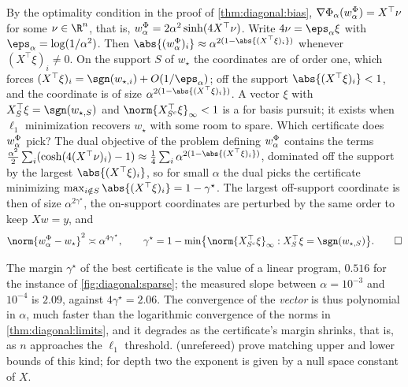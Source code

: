 \begin{refsection}
\begin{heuristic}
By the optimality condition in the proof of \cref{thm:diagonal:bias}, $\nabla\Phi_\alpha(w^\Phi_\alpha)=X^\top\nu$ for some $\nu\in\R^n$, that is, $w^\Phi_\alpha=2\alpha^2\sinh(4X^\top\nu)$. Write $4\nu=\eps_\alpha\xi$ with $\eps_\alpha=\log(1/\alpha^2)$. Then $\abs{(\diagwphi)_i}\approx\alpha^{2(1-\abs{(X^\top\xi)_i})}$ whenever $(X^\top\xi)_i\ne0$. On the support $S$ of $w_\star$ the coordinates are of order one, which forces $(X^\top\xi)_i=\sgn(w_{\star,i})+O(1/\eps_\alpha)$; off the support $\abs{(X^\top\xi)_i}<1$, and the coordinate is of size $\alpha^{2(1-\abs{(X^\top\xi)_i})}$. A vector $\xi$ with $X_S^\top\xi=\sgn(w_{\star,S})$ and $\norm{X_{S^c}^\top\xi}_\infty<1$ is a  for basis pursuit; it exists when $\ell_1$ minimization recovers $w_\star$ with some room to spare. Which certificate does $w^\Phi_\alpha$ pick? The dual objective of the problem defining $w^\Phi_\alpha$ contains the terms $\frac{\alpha^2}2\sum_i(\cosh(4(X^\top\nu)_i)-1)\approx\frac14\sum_i\alpha^{2(1-\abs{(X^\top\xi)_i})}$, dominated off the support by the largest $\abs{(X^\top\xi)_i}$, so for small $\alpha$ the dual picks the certificate minimizing $\max_{i\notin S}\abs{(X^\top\xi)_i}=1-\gamma^\star$. The largest off-support coordinate is then of size $\alpha^{2\gamma^\star}$, the on-support coordinates are perturbed by the same order to keep $Xw=y$, and
\begin{equation}\label{eq:diagonal:richrate}
  \norm{\diagwphi-w_\star}^2\asymp\alpha^{4\gamma^\star},\qquad \gamma^\star=1-\min\bigl\{\norm{X_{S^c}^\top\xi}_\infty:X_S^\top\xi=\sgn(w_{\star,S})\bigr\}.\qedhere
\end{equation}
\end{heuristic}

The margin $\gamma^\star$ of the best certificate is the value of a linear program, $0.516$ for the instance of \cref{fig:diagonal:sparse}; the measured slope between $\alpha=10^{-3}$ and $10^{-4}$ is $2.09$, against $4\gamma^\star=2.06$. The convergence of the \emph{vector} is thus polynomial in $\alpha$, much faster than the logarithmic convergence of the norms in \cref{thm:diagonal:limits}, and it degrades as the certificate's margin shrinks, that is, as $n$ approaches the $\ell_1$ threshold. \Textcite{MattStoger2025} (unrefereed) prove matching upper and lower bounds of this kind; for depth two the exponent is given by a null space constant of $X$.


\end{refsection}
